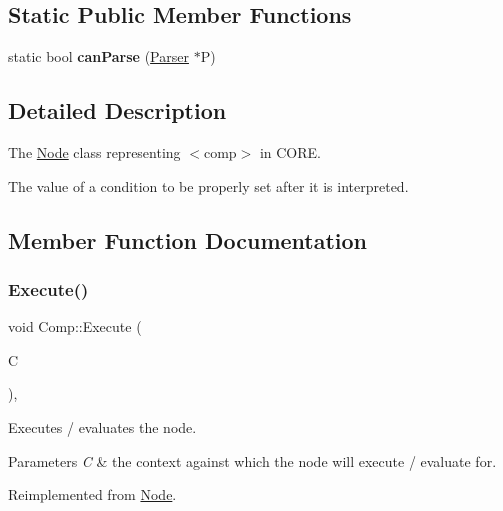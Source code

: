 \subsection*{Static Public Member Functions}
\begin{DoxyCompactItemize}
\item 
\mbox{\label{class_comp_a0ce1bfe63ccdde9b167b1091304a4d7d}} 
static bool {\bfseries can\+Parse} (\mbox{\hyperlink{class_parser}{Parser}} $\ast$P)
\end{DoxyCompactItemize}


\subsection{Detailed Description}
The \mbox{\hyperlink{class_node}{Node}} class representing {\ttfamily $<$comp$>$} in C\+O\+RE. 

The value of a condition to be properly set after it is interpreted. 

\subsection{Member Function Documentation}
\mbox{\label{class_comp_a3f6905eb5b4ed784a458070315fee5a1}} 
\subsubsection{\texorpdfstring{Execute()}{Execute()}}
{\footnotesize\ttfamily void Comp\+::\+Execute (\begin{DoxyParamCaption}\item[{\mbox{\hyperlink{class_a_s_t_context}{A\+S\+T\+Context}} \&}]{C }\end{DoxyParamCaption})\hspace{0.3cm}{\ttfamily [override]}, {\ttfamily [virtual]}}

Executes / evaluates the node. 
\begin{DoxyParams}{Parameters}
{\em C} & the context against which the node will execute / evaluate for. \\
\hline
\end{DoxyParams}


Reimplemented from \mbox{\hyperlink{class_node_a27ad1ba81d2596817b361368282bcbfa}{Node}}.

\mbox{\label{class_comp_abc0e0fdd3a8963d5d60017c38765d0b4}} 
